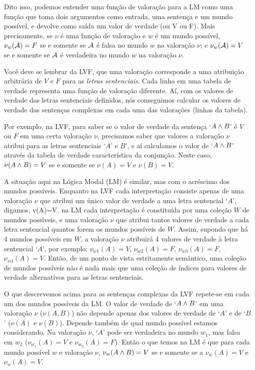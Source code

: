 Dito isso, podemos entender uma função de valoração para a LM como uma função que toma dois argumentos como entrada, uma sentença e um mundo possível, e devolve como saída um valor de verdade (ou V ou F). 
Mais precisamente, se $\nu$   é uma função de valoração  e $w$ é um mundo possível,   $\nu_w(\mathcal{A})=F$  se e somente se $\mathcal{A}$ é falsa no mundo $w$ na valoração $\nu$; e $\nu_w(\mathcal{A})=V$  se e somente se $\mathcal{A}$  é verdadeira no mundo $w$ na valoração $\nu$.

Você deve se lembrar da LVF, que uma valoração corresponde a uma atribuição arbitrária de $V$ e $F$ para as \emph{letras sentenciais}. Cada linha em uma tabela de verdade representa uma função de valoração diferente. Aí, com os valores de verdade das letras sentenciais definidos, nós conseguimos calcular os valores de verdade das sentenças complexas em cada uma das valorações (linhas da tabela).

Por exemplo, na LVF, para saber se o valor de verdade da sentença `$A\wedge B$' é $V$ ou $F$ em uma certa valoração $\nu$, precisamos saber que valores a valoração $\nu$ atribui para as letras sentenciais `$A$' e $B$', e aí calculamos o valor de `$A\wedge B$' através da tabela de verdade característica da conjunção. Neste caso, $\nu(A\wedge B)=V$ se e somente se $\nu(A)=V$ e $\nu(B)=V$.   

A situação aqui na Lógica Modal (LM) é similar, mas com o acréscimo dos mundos possíveis. 
Enquanto na LVF cada interpretação consiste apenas de uma valoração $\nu$ que atribui um único valor de verdade a uma letra sentencial `$A$', digamos, v(A)=V,   na LM cada interpretação é constituída por uma coleção $W$ de mundos possíveis, e uma valoração $\nu$ que atribui tantos valores de verdade a cada letra sentencial quantos forem os mundos possíveis de $W$. Assim, supondo que há 4 mundos possíveis em $W$, a valoração $\nu$ atribuirá 4 valores de verdade à letra sentencial `$A$', por exemplo: $\nu_{w1}(A)=V$, $\nu_{w2}(A)=F$,  $\nu_{w3}(A)=F$,  $\nu_{w4}(A)=V$. Então, de um ponto de vista estritamente semântico, uma coleção de mundos possíveis não é nada mais que uma coleção de índices para valores de verdade alternativos para as letras sentenciais.

O que descrevemos acima para as sentenças complexas da LVF repete-se em cada um dos mundos possíveis da LM. O valor de verdade de `$A\wedge B$' em uma valoração $\nu$  
 ($\nu (A,B)$)  não depende apenas dos valores de verdade de `$A$' e de `$B$' ($\nu (A)$ e $\nu(B)$). 
Depende também de qual mundo possível estamos considerando. Na valoração $\nu$,  `$A$' pode ser verdadeira no mundo $w_1$, mas falsa em $w_2$
  ($\nu_{w_1}(A)=V$ e $\nu_{w_2}(A)=F$). Então o que temos na LM é que para cada mundo possível $w$ e valoração $\nu$, $\nu_w(A\wedge B) = V$ se e somente se a $\nu_w(A) = V$ e $\nu_w(A) = V$.

